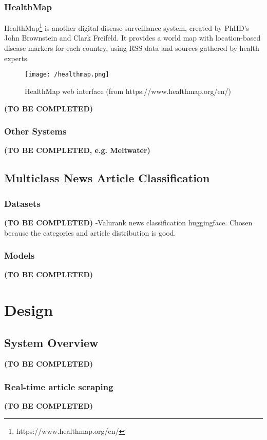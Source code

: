 \documentclass{l4proj}
\begin{document}
\subsection{HealthMap}
HealthMap\footnote{https://www.healthmap.org/en/} is another digital disease surveillance system, created by PhHD's John Brownstein and Clark Freifeld. It provides a world map with location-based disease markers for each country, using RSS data and sources gathered by health experts. \par
\begin{figure}[h]
\texttt{[image: /healthmap.png]}
\caption{HealthMap web interface (from https://www.healthmap.org/en/)}
\label{fig:healthmap_visualisation}
\end{figure}
\textbf{(TO BE COMPLETED)}


\subsection{Other Systems}
\textbf{(TO BE COMPLETED, e.g. Meltwater)}


\section{Multiclass News Article Classification}
\subsection{Datasets}
\textbf{(TO BE COMPLETED)}
-Valurank news classification huggingface. Chosen because the categories and article distribution is good.
\subsection{Models}
\textbf{(TO BE COMPLETED)}


\chapter{Design}
\section{System Overview}
\textbf{(TO BE COMPLETED)}
\subsection{Real-time article scraping}
\textbf{(TO BE COMPLETED)}
\end{document}
